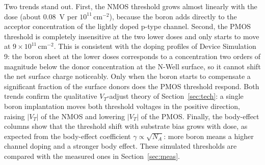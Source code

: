 Two trends stand out. First, the NMOS threshold grows almost linearly with the dose (about $0.08$~V per $10^{11}\,\mathrm{cm^{-2}}$), because the boron adds directly to the acceptor concentration of the lightly doped p-type channel. Second, the PMOS threshold is completely insensitive at the two lower doses and only starts to move at $9\times10^{11}\,\mathrm{cm^{-2}}$. This is consistent with the doping profiles of Device Simulation 9: the boron sheet at the lower doses corresponds to a concentration two orders of magnitude below the donor concentration at the N-Well surface, so it cannot shift the net surface charge noticeably. Only when the boron starts to compensate a significant fraction of the surface donors does the PMOS threshold respond. Both trends confirm the qualitative $V_T$-adjust theory of Section~\ref{sec:tech}: a single boron implantation moves both threshold voltages in the positive direction, raising $|V_T|$ of the NMOS and lowering $|V_T|$ of the PMOS. Finally, the body-effect columns show that the threshold shift with substrate bias grows with dose, as expected from the body-effect coefficient $\gamma \propto \sqrt{N_A}$: more boron means a higher channel doping and a stronger body effect. These simulated thresholds are compared with the measured ones in Section~\ref{sec:meas}.




